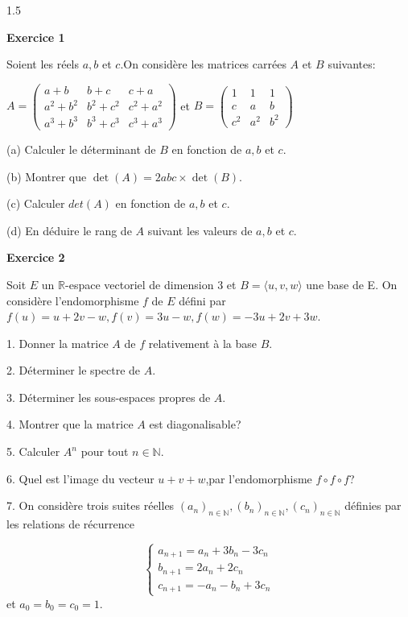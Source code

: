 \documentclass[12pt]{article}
\begin{document}
\begin{spacing}{1.5}

\textbf{Exercice 1}

 Soient les réels $a,b$ et $c$.On considère les matrices carrées $A$ et $B$ suivantes:

$
A=\begin{pmatrix}
a+b & b+c & c+a \\ 
a^2+b^2 & b^2+c^2 & c^2+a^2 \\ 
a^3+b^3 & b^3+c^3 & c^3+a^3
\end{pmatrix}$ et $B=\begin{pmatrix}
1 & 1 & 1 \\ 
c & a & b \\ 
c^2 & a^2 & b^2
\end{pmatrix} $

(a) Calculer le déterminant de $B$ en fonction de $a,b$ et $c$.

(b) Montrer que $\det(A)=2abc\times\det(B)$.

(c) Calculer $det(A)$ en fonction de $a,b$ et $c$.

(d) En déduire le rang de $A$ suivant les valeurs de $a,b$ et $c$.

\textbf{Exercice 2 }

 Soit $E$ un $\mathbb{R}$-espace vectoriel de dimension 3 et $B=\langle u,v,w\rangle$ une base de E.
 On considère l'endomorphisme $f$ de $E$ défini par
  $f(u)=u+2v-w, f(v)=3u-w, f(w)=-3u+2v+3w$.
 
 1. Donner la matrice $A$ de $f$  relativement à la base $B$.
 
 2. Déterminer le spectre de $A$.
 
 3. Déterminer les sous-espaces propres de $A$.
 
 4. Montrer que la matrice $A$ est diagonalisable?
 
 5. Calculer $A^n$ pour tout $n\in \mathbb{N}$.
 
 6. Quel est l'image du vecteur $u+v+w$,par l'endomorphisme $f\circ f\circ f$?
 
 7. On considère trois suites réelles $(a_n)_{n\in \mathbb{N}},(b_n)_{n\in \mathbb{N}},(c_n)_{n\in \mathbb{N}}$ définies par les relations de récurrence
 
\[
\begin{cases}
a_{n+1} = a_n+3b_n-3c_n\\
b_{n+1} = 2a_n+2c_n\\
c_{n+1} = -a_n-b_n+3c_n
\end{cases}
\]
et $a_0=b_0=c_0=1$.


\end{spacing}
\end{document}
